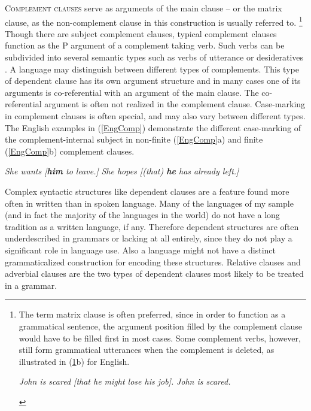\textsc{Complement clauses} serve as arguments of the main clause -- or the matrix clause, as the non-complement clause in this construction is usually referred to. 
\footnote{The term matrix clause is often preferred, since in order to function as a grammatical sentence, the argument position filled by the complement clause would have to be filled first in most cases.
Some complement verbs, however, still form grammatical utterances when the complement is deleted, as illustrated in (\ref{EngComp1}b) for English. 

\begin{exe}\ex\label{EngComp1} 
\begin{xlist} \ex \textit{John is scared  {\rm[}that he might lose his job{\rm]}.}
\ex \textit{John is scared.}
\end{xlist}
\end{exe}
} 
Though there are subject complement clauses, typical complement clauses function as the P argument of a complement taking verb. 
Such verbs can be subdivided into several semantic types such as verbs of utterance or desideratives \citep[an extensive discussion of the different types of complement verbs can be found in][120--145]{Complement}.
A language may distinguish between different types of complements. 
This type of dependent clause has its own argument structure and in many cases one of its arguments is co-referential with an argument of the main clause. 
The co-referential argument is often not realized in the complement clause. 
Case-marking in complement clauses is often special, and may also vary between different types. 
The English examples in (\ref{EngComp}) demonstrate the different case-marking of the complement-internal subject in non-finite (\ref{EngComp}a) and finite (\ref{EngComp}b) complement clauses.

\begin{exe}\ex\label{EngComp}
\begin{xlist}
\ex \textit{She wants  {\rm[}\textbf{him} to leave.{\rm]}}
\ex \textit{She hopes  {\rm[}(that) \textbf{he} has already left.{\rm]}}
\end{xlist}
\end{exe}

Complex syntactic structures like dependent clauses are a feature found more often in written than in spoken language. 
Many of the languages of my sample (and in fact the majority of the languages in the world) do not have a long tradition as a written language, if any. 
Therefore dependent structures are often underdescribed in grammars or lacking at all entirely, since they do not play a significant role in language use. 
Also a language might not have a distinct grammaticalized construction for encoding these structures. %
Relative clauses and adverbial clauses are the two types of dependent clauses most likely to be treated in a grammar. 

